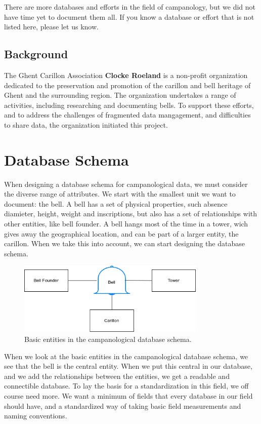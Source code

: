 \documentclass[11pt, a4paper]{article}
\begin{document}
There are more databases and efforts in the field of campanology, but we did not have time yet to document them all. If you know a database or effort that is not listed here, please let us know.

\subsection{Background}

The Ghent Carillon Association \textbf{Clocke Roeland} is a non-profit organization dedicated to the preservation and promotion of the carillon and bell heritage of Ghent and the surrounding region. The organization undertakes a range of activities, including researching and documenting bells. To support these efforts, and to address the challenges of fragmented data mangagement, and difficulties to share data, the organization initiated this project.
    
\section{Database Schema}

When designing a database schema for campanological data, we must consider the diverse range of attributes. We start with the smallest unit we want to document: the bell. A bell has a set of physical properties, such absence diamieter, height, weight and inscriptions, but also has a set of relationships with other entities, like bell founder. A bell hangs most of the time in a tower, wich gives away the geographical location, and can be part of a larger entity, the carillon. When we take this into account, we can start designing the database schema.

\begin{figure}[h!]
    \centering
    \includegraphics[width=0.8\textwidth]{images/basic_entities.png}
    \caption{Basic entities in the campanological database schema.}
    \label{fig:basic-entities}
\end{figure}

When we look at the basic entities in the campanological database schema, we see that the bell is the central entity. When we put this central in our database, and we add the relationships between the entities, we get a readable and 
connectible database. To lay the basis for a standardization in this field, we off course need more. We want a minimum of fields that every database in our field should have, and a standardized way of taking basic field measurements and naming conventions.
\end{document}
